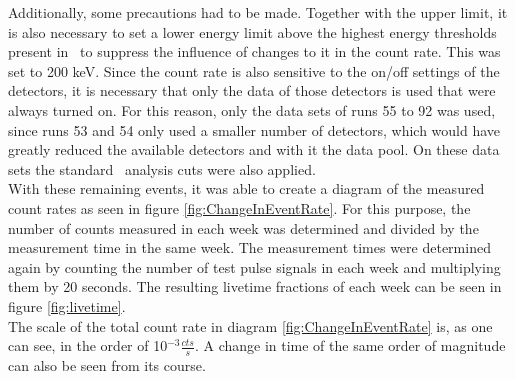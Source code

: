 \documentclass[encoding=utf8,british]{tumphthesis}
\begin{document}
Additionally, some precautions had to be made.
Together with the upper limit, it is also necessary to set a lower energy limit above the highest energy thresholds present in \PII\ to suppress the influence of changes to it in the count rate.
This was set to 200 keV.
Since the count rate is also sensitive to the on/off settings of the detectors, it is necessary that only the data of those detectors is used that were always turned on.
For this reason, only the data sets of runs 55 to 92 was used, since runs 53 and 54 only used a smaller number of detectors, which would have greatly reduced the available detectors and with it the data pool.
On these data sets the standard \gerda\ analysis cuts were also applied.
\\

With these remaining events, it was able to create a diagram of the measured count rates as seen in figure \ref{fig:ChangeInEventRate}.
For this purpose, the number of counts measured in each week was determined and divided by the measurement time in the same week.
The measurement times were determined again by counting the number of test pulse signals in each week and multiplying them by 20 seconds.
The resulting livetime fractions of each week can be seen in figure \ref{fig:livetime}.
\\

The scale of the total count rate in diagram \ref{fig:ChangeInEventRate} is, as one can see, in the order of 10$^{-3} \frac{\unit{cts}}{\unit{s}}$.
A change in time of the same order of magnitude can also be seen from its course.
\\
\end{document}
